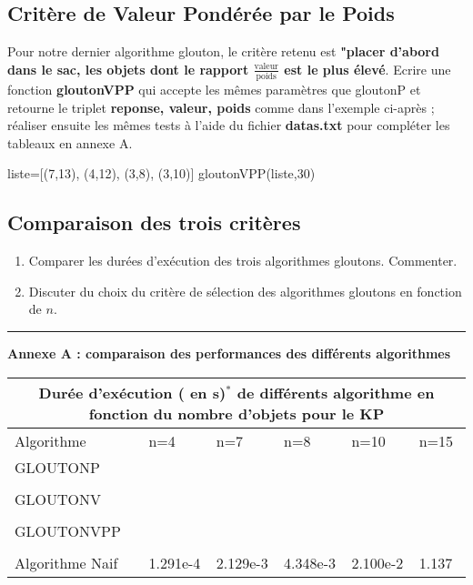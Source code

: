 \documentclass[12pt,french]{article}
\begin{document}
	
	\subsection{Critère de Valeur Pondérée par le Poids}
	
	Pour notre dernier algorithme glouton, le critère retenu est \textbf{"placer d'abord dans le sac, les objets dont le rapport \boldmath\( \frac{\text{valeur}}{\text{poids}} \) est le plus élevé}.  Ecrire une fonction \textbf{gloutonVPP} qui accepte les mêmes paramètres que gloutonP et retourne le triplet \textbf{reponse, valeur, poids} comme dans l'exemple ci-après ; réaliser ensuite les mêmes tests à l'aide du fichier  \textbf{datas.txt} pour compléter les tableaux en annexe A.
	\begin{tcolorbox}[enhanced,attach boxed title to top center={yshift=-3mm,yshifttext=-1mm},
		colback=green!5!white,colframe=green!75!black,colbacktitle=green!25!black,
		title=Console Python, fonttitle=\bfseries,
		boxed title style={size=small,colframe=blue!25!black} ]
\begin{pyconsole}
liste=[(7,13), (4,12), (3,8), (3,10)]
gloutonVPP(liste,30)
\end{pyconsole}
	\end{tcolorbox}
	\subsection{Comparaison des trois critères}
	\begin{enumerate}
\item  Comparer les durées d'exécution des trois algorithmes gloutons. Commenter. 	
	\item Discuter du choix du critère de sélection des algorithmes gloutons en fonction de $n$.
	\end{enumerate}
\hrule
\small	
	\begin{center}
		\textbf{Annexe A : comparaison des performances des différents algorithmes}
	\end{center}


	\begin{tabular}{ |p{2.6cm}|p{2.6cm}|p{2.6cm}|p{2.6cm}|p{2.6cm}|p{2.6cm}| }
		\hline
		\multicolumn{6}{|c|}{Durée d'exécution ( en s)$^*$ de différents algorithme en fonction du nombre d'objets pour le KP} \\
		\hline
		Algorithme& n=4&n=7&n=8& n=10&n=15\\
		\hline
		GLOUTONP &&&&& \\
		&&&&&\\
		\hline
		GLOUTONV &&&&& \\
		&&&&&\\
		\hline
		GLOUTONVPP &&&&&\\
		&&&&&\\
		\hline
	Algorithme Naif    &1.291e-4& 2.129e-3&4.348e-3 & 2.100e-2 &1.137 \\
		\hline
	\end{tabular}
	
\end{document}
